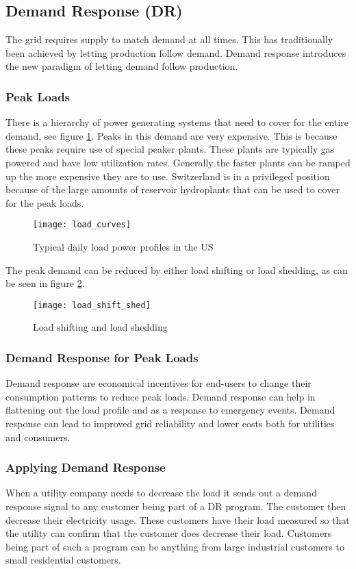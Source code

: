\subsection{Demand Response (DR)}
The grid requires supply to match demand at all times.
This has traditionally been achieved by letting production follow demand.
Demand response introduces the new paradigm of letting demand follow production.

\subsubsection{Peak Loads}
There is a hierarchy of power generating systems that need to cover for the entire demand, see figure \ref{fig:load_curves}.
Peaks in this demand are very expensive.
This is because these peaks require use of special peaker plants.
These plants are typically gas powered and have low utilization rates.
Generally the faster plants can be ramped up the more expensive they are to use.
Switzerland is in a privileged position because of the large amounts of reservoir hydroplants that can be used to cover for the peak loads.\\

\begin{figure}
    \centering
    \texttt{[image: load\_curves]}
    \caption{Typical daily load power profiles in the US}
    \label{fig:load_curves}
\end{figure}

The peak demand can be reduced by either load shifting or load shedding, as can be seen in figure \ref{fig:load_shift_shed}.

\begin{figure}
    \centering
    \texttt{[image: load\_shift\_shed]}
    \caption{Load shifting and load shedding}
    \label{fig:load_shift_shed}
\end{figure}

\subsubsection{Demand Response for Peak Loads}
Demand response are economical incentives for end-users to change their consumption patterns to reduce peak loads.
Demand response can help in flattening out the load profile and as a response to emergency events.
Demand response can lead to improved grid reliability and lower costs both for utilities and consumers.

\subsubsection{Applying Demand Response}
When a utility company needs to decrease the load it sends out a demand response signal to any customer being part of a DR program.
The customer then decrease their electricity usage.
These customers have their load measured so that the utility can confirm that the customer does decrease their load.
Customers being part of such a program can be anything from large industrial customers to small residential customers.\\

